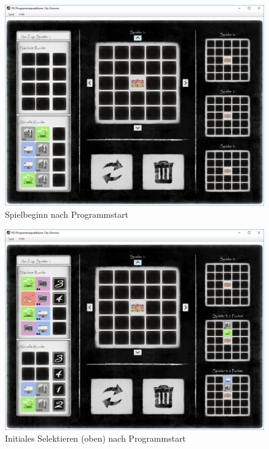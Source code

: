 \begin{figure}
	\centering
	\includegraphics{screenshots/screenshot_Spielbeginn.png}
	\caption[Spielbeginn]{Spielbeginn nach Programmstart}
	\label{fig:spielbeginnGui}
\end{figure}

\begin{figure}
	\centering
	\includegraphics{screenshots/screenshot_InitialesSelektieren2.png}
	\caption[Initiales Selektieren - oben]{Initiales Selektieren (oben) nach Programmstart}
	\label{fig:initialesSelektierenOben}
\end{figure}

